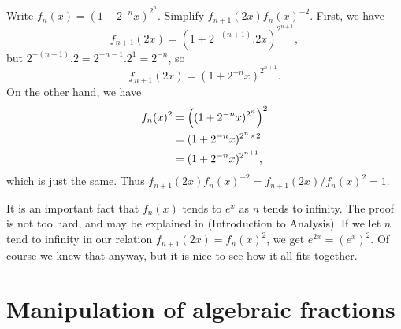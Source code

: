 \documentclass[a4paper]{book}
\theoremstyle{definition}
\newenvironment{starex}{
 \renewcommand{\thetheorem}{\arabic{chapter}.\arabic{section}.\arabic{theorem}${}^*$}
 \exercise
}{\endexercise}
\renewenvironment{solution}{\SolutionInline}{\endSolutionInline}
\begin{document}
\begin{starex}
 Write $f_n(x)=(1+2^{-n}x)^{2^n}$.  Simplify
 $f_{n+1}(2x)f_n(x)^{-2}$. 
\end{starex}
\begin{solution}
 First, we have
 \[ f_{n+1}(2x)=(1+2^{-(n+1)}.2x)^{2^{n+1}}, \]
 but $2^{-(n+1)}.2=2^{-n-1}.2^1=2^{-n}$, so
 \[ f_{n+1}(2x)=(1+2^{-n}x)^{2^{n+1}}. \]
 On the other hand, we have
 \begin{align*}
  f_n(x)^2 &= \left((1+2^{-n}x)^{2^n}\right)^2 \\
           &= (1+2^{-n}x)^{2^n\times 2} \\
           &= (1+2^{-n}x)^{2^{n+1}},
 \end{align*}
 which is just the same.  Thus 
 $f_{n+1}(2x)f_n(x)^{-2}=f_{n+1}(2x)/f_n(x)^2=1$.

 It is an important fact that $f_n(x)$ tends to $e^x$ as $n$ tends to
 infinity.  The proof is not too hard, and may be explained in
  (Introduction to Analysis).  If we let $n$ tend to infinity
 in our relation $f_{n+1}(2x)=f_n(x)^2$, we get $e^{2x}=(e^x)^2$.  Of
 course we knew that anyway, but it is nice to see how it all fits
 together. 
\end{solution}

\section{Manipulation of algebraic fractions}
\label{sec-fract}
\end{document}
